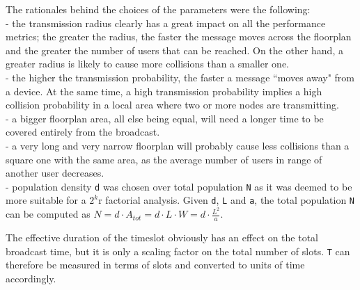 The rationales behind the choices of the parameters were the following:\\
 - the transmission radius clearly has a great impact on all the performance metrics; the greater the radius, the faster the message moves across the floorplan and the greater the number of users that can be reached. On the other hand, a greater radius is likely to cause more collisions than a smaller one.\\
- the higher the transmission probability, the faster a message ``moves away" from a device. At the same time, a high transmission probability implies a high collision probability in a local area where two or more nodes are transmitting.\\
- a bigger floorplan area, all else being equal, will need a longer time to be covered entirely from the broadcast.\\
- a very long and very narrow floorplan will probably cause less collisions than a square one with the same area, as the average number of users in range of another user decreases.\\
- population density \texttt{d} was chosen over total population \texttt{N} as it was deemed to be more suitable for a $2^{k}$r factorial analysis.
Given \texttt{d}, \texttt{L} and \texttt{a}, the total population \texttt{N} can be computed as $N=d \cdot A_{tot} = d \cdot L \cdot W = d \cdot \frac{L^{2}}{a}$.

The effective duration of the timeslot obviously has an effect on the total broadcast time, but it is only a scaling factor on the total number of slots. \texttt{T} can therefore be measured in terms of slots and converted to units of time accordingly.
